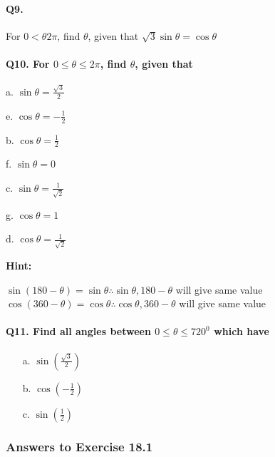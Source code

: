 \documentclass{article}
\begin{document}
\paragraph{Q9.}
For $0<\theta2\pi$, find $\theta$, given that $\sqrt{3}\sin\theta = \cos\theta$

\paragraph {Q10. For $0\leq\theta\leq2\pi$, find $\theta$, given that}
\begin{enumerate}
        \begin{paracol}{3}
          \item[a.] $\sin\theta = \frac{\sqrt{3}}{2}$
          \item[e.] $\cos\theta = -\frac{1}{2}$
          \switchcolumn
          \item[b.] $\cos\theta = \frac{1}{2}$
          \item[f.] $\sin\theta = 0$
          \switchcolumn
          \item[c.] $\sin\theta = \frac{1}{\sqrt{2}}$
          \item[g.] $\cos\theta = 1$
          \switchcolumn
          \item[d.] $\cos\theta = \frac{1}{\sqrt{2}}$
        \end{paracol}
\end{enumerate}

{\scriptsize \textbf{Hint:}}

$\sin(180-\theta) = \sin\theta \therefore \sin\theta, 180-\theta$ will give same value \\

$\cos(360-\theta) = \cos\theta \therefore \cos\theta, 360-\theta$ will give same value

\paragraph{Q11. Find all angles between $0\leq\theta\leq720^{0}$ which have}
\begin{enumerate}
          \item[a.] $\sin(\frac{\sqrt{3}}{2})$
          \item[b.] $\cos(-\frac{1}{2})$
          \item[c.] $\sin(\frac{1}{2})$
\end{enumerate}

\subsubsection {Answers to Exercise 18.1}
\end{document}
